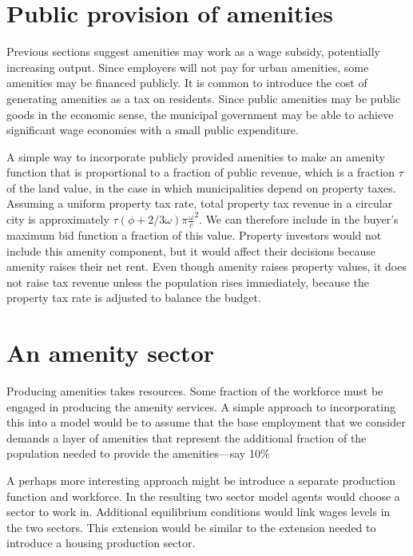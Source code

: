 \section{Public provision of amenities}
Previous sections suggest amenities may work as a wage subsidy, potentially increasing output. Since employers will not pay %
for urban amenities, some amenities may be financed publicly. It is common to introduce the cost of generating amenities as a tax on residents.  Since public amenities may be \glspl{public good} in the economic sense, the municipal government may be able to achieve significant wage economies with a small public expenditure.

A simple way to incorporate publicly provided amenities to make an amenity function that is proportional to a fraction of public revenue, which is a fraction $\tau$ of the land value, in the case in which municipalities depend on property taxes. Assuming a uniform property tax rate, total property tax revenue in a circular city is approximately $\tau(\phi+2/3 \omega)\pi \frac{\omega}{c}^2$. We can therefore include in the buyer's maximum bid function a fraction of this value. Property investors would not include this amenity component, but it would affect their decisions because amenity raises their net rent. Even though amenity raises property values, it does not raise tax revenue unless the population rises immediately, because the property tax rate is adjusted to balance the budget. %

\section{An amenity sector}
Producing amenities takes resources. Some fraction of the workforce must be engaged in producing the amenity services. A simple approach to incorporating this into a model would be to assume that the base employment that we consider demands a layer of amenities that represent the additional fraction of the population needed to provide the amenities---say 10\%  

A perhaps more interesting approach might be introduce a separate production function and workforce. In the  resulting two sector model agents would choose a sector to work in. Additional equilibrium conditions would link wages levels in the two sectors. This extension would be similar to the extension needed to introduce a housing production sector. %



